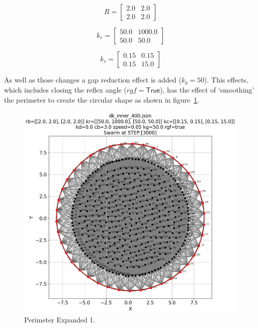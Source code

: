 \documentclass[12pt,a4paper]{IEEEtran}
\newcommand{\kc}{\mathit{k_{c}}}
\newcommand{\kr}{\mathit{k_{r}}}
\newcommand{\kg}{\mathit{k_{g}}}
\newcommand{\rb}{\mathit{R}}
\newcommand{\rgf}{\mathit{rgf}}
\begin{document}
\begin{equation}\label{eq:rbexp2}
\rb = 
\begin{bmatrix}
2.0 & 2.0\\
2.0 & 2.0
\end{bmatrix}
\end{equation}

\begin{equation}\label{eq:krexp2}
\kr = 
\begin{bmatrix}
50.0 & 1000.0\\
50.0 & 50.0
\end{bmatrix}
\end{equation}

\begin{equation}\label{eq:kcexp2}
\kc = 
\begin{bmatrix}
0.15 & 0.15\\
0.15 & 15.0
\end{bmatrix}
\end{equation}

As well as those changes a gap reduction effect is added ($\kg=50$). This effects, which includes closing the reflex angle ($\rgf=\mathsf{True}$), has the effect of `smoothing' the perimeter to create the circular shape as shown in figure~\ref{fig:perimExpand1}.

\begin{figure}[H]
	\begin{center}
		\includegraphics[width=1.0\linewidth]{figures/inner1}
	\end{center}
	\caption{Perimeter Expanded 1. \label{fig:perimExpand1}}
\end{figure}
\end{document}
